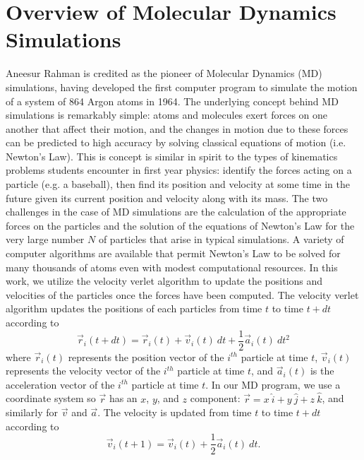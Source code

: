 \documentclass[journal=jpclcd,manuscript=article]{achemso}
\begin{document}
\section{Overview of Molecular Dynamics Simulations}
Aneesur Rahman is credited as the pioneer of Molecular Dynamics (MD) simulations, having developed the first computer
program to simulate the motion of a system of 864 Argon atoms in 1964.%
The underlying concept behind MD simulations is remarkably simple:  atoms and molecules exert forces on one another that affect their motion,
and the changes in motion due to these forces can be predicted to high accuracy by solving classical equations of motion (i.e. Newton's Law).
This is concept is similar in spirit to the types of kinematics problems students encounter in first year physics: identify
the forces acting on a particle (e.g. a baseball), then find its position and velocity at some time in the future given its current
position and velocity along with its mass.  
The two challenges in the case of MD simulations are the calculation of the appropriate forces on the particles and the 
solution of the equations of
Newton's Law for the very large number $N$ of particles that arise in typical simulations.  A variety of computer algorithms are
available that permit Newton's Law to be solved for many thousands of atoms even with modest computational resources.
In this work, we utilize the velocity verlet algorithm to update the positions and velocities of
the particles once the forces have been computed.     
The velocity verlet algorithm updates the positions of each particles from time $t$ to time $t + dt$ according to 
\begin{equation}
\vec{r}_{i}(t+dt) = \vec{r}_{i}(t) + \vec{v}_i(t) \: dt + \frac{1}{2} \vec{a}_i(t) \: dt^2 
\end{equation}
where $\vec{r}_{i}(t)$ represents the position vector of the $i^{th}$ particle at time $t$, 
$\vec{v}_i(t)$ represents the velocity vector of the $i^{th}$ particle at time $t$, and
$\vec{a}_i(t)$ is the acceleration vector of the $i^{th}$ particle at time $t$.  In our MD program,
we use a coordinate system so $\vec{r}$  has an $x$, $y$, and $z$ component:  $\vec{r} = x \: \hat{i} + y \: \hat{j} + z \: \hat{k}$,
and similarly for $\vec{v}$ and $\vec{a}$.  The velocity is updated from time $t$ to time $t+dt$ according to
\begin{equation}
\vec{v}_i (t+1) = \vec{v}_i (t) +  \frac{1}{2} \vec{a}_i(t) \: dt.
\end{equation}
\end{document}
